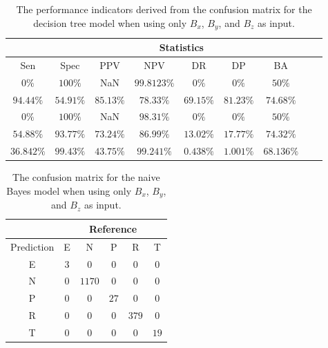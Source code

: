 \begin{table}[!ht]
	\centering
	\begin{tabular}{|c|c|c|c|c|c|c|c|c|}
		\hline
		 & \multicolumn{7}{c|}{Statistics} \\ \hline
		Sen & Spec & PPV & NPV & DR & DP & BA \\ \hline
		$0\%$ & $100\%$ & NaN & $99.8123\%$ & $0\%$ & $0\%$ & $50\%$ \\ \hline
		$94.44\%$ & $54.91\%$ & $85.13\%$ & $78.33\%$ & $69.15\%$ & $81.23\%$ & $74.68\%$ \\ \hline
		$0\%$ & $100\%$ & NaN & $98.31\%$ & $0\%$ & $0\%$ & $50\%$ \\ \hline
		$54.88\%$ & $93.77\%$ & $73.24\%$ & $86.99\%$ & $13.02\%$ & $17.77\%$ & $74.32\%$ \\ \hline
		$36.842\%$ & $99.43\%$ & $43.75\%$ & $99.241\%$ & $0.438\%$ & $1.001\%$ & $68.136\%$ \\ \hline
	\end{tabular}
	\caption{The performance indicators derived from the confusion matrix for the decision tree model when using only $B_{x}$, $B_{y}$, and $B_{z}$ as input.}
	\label{tab:cs:coord:C5.0}
\end{table}

\begin{table}[!ht]
	\centering
	\begin{tabular}{|c|c|c|c|c|c|}
		\hline
		 & \multicolumn{5}{|c|}{Reference} \\ \hline
		 Prediction & E & N & P & R & T \\ \hline
		 E & $3$ & $0$ & $0$ & $0$ & $0$ \\ \hline
		 N & $0$ & $1170$ & $0$ & $0$ & $0$ \\ \hline
		 P & $0$ & $0$ & $27$ & $0$ & $0$ \\ \hline
		 R & $0$ & $0$ & $0$ & $379$ & $0$ \\ \hline
		 T & $0$ & $0$ & $0$ & $0$ & $19$ \\ \hline
	\end{tabular}
	\caption{The confusion matrix for the naive Bayes model when using only $B_{x}$, $B_{y}$, and $B_{z}$ as input.}
	\label{tab:cm:coord:nb}
\end{table}

